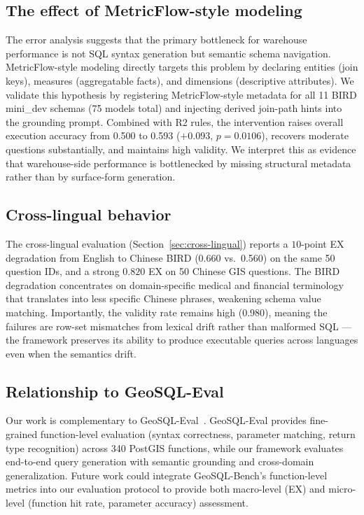 \documentclass[11pt]{article}
\begin{document}
\subsection{The effect of MetricFlow-style modeling}

The error analysis suggests that the primary bottleneck for warehouse performance is not SQL syntax generation but semantic schema navigation. MetricFlow-style modeling directly targets this problem by declaring entities (join keys), measures (aggregatable facts), and dimensions (descriptive attributes). We validate this hypothesis by registering MetricFlow-style metadata for all 11 BIRD mini\_dev schemas (75 models total) and injecting derived join-path hints into the grounding prompt. Combined with R2 rules, the intervention raises overall execution accuracy from 0.500 to 0.593 ($+0.093$, $p=0.0106$), recovers moderate questions substantially, and maintains high validity. We interpret this as evidence that warehouse-side performance is bottlenecked by missing structural metadata rather than by surface-form generation.

\subsection{Cross-lingual behavior}

The cross-lingual evaluation (Section~\ref{sec:cross-lingual}) reports a $10$-point EX degradation from English to Chinese BIRD (0.660 vs.\ 0.560) on the same 50 question IDs, and a strong $0.820$ EX on 50 Chinese GIS questions. The BIRD degradation concentrates on domain-specific medical and financial terminology that translates into less specific Chinese phrases, weakening schema value matching. Importantly, the validity rate remains high ($0.980$), meaning the failures are row-set mismatches from lexical drift rather than malformed SQL --- the framework preserves its ability to produce executable queries across languages even when the semantics drift.

\subsection{Relationship to GeoSQL-Eval}

Our work is complementary to GeoSQL-Eval~\cite{hou2025geosql}. GeoSQL-Eval provides fine-grained function-level evaluation (syntax correctness, parameter matching, return type recognition) across 340 PostGIS functions, while our framework evaluates end-to-end query generation with semantic grounding and cross-domain generalization. Future work could integrate GeoSQL-Bench's function-level metrics into our evaluation protocol to provide both macro-level (EX) and micro-level (function hit rate, parameter accuracy) assessment.
\end{document}
